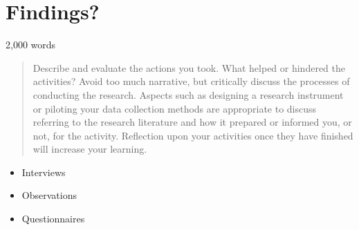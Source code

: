 \section{Findings?}
2,000 words 

\begin{quote}
Describe and evaluate the actions you took. What helped or hindered the activities? Avoid too much narrative, but critically discuss the processes of conducting the research. Aspects such as designing a research instrument or piloting your data collection methods are appropriate to discuss referring to the research literature and how it prepared or informed you, or not, for the activity. Reflection upon your activities once they have finished will increase your learning.
\end{quote}

\begin{itemize}
\item Interviews
\item Observations
\item Questionnaires 
\end{itemize}